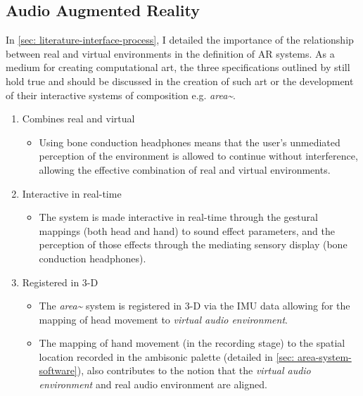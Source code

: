 \subsection{Audio Augmented Reality}            \label{sec: area-discussion-aar}
In \autoref{sec: literature-interface-process}, I detailed the importance of the relationship between real and virtual environments in the definition of AR systems. As a medium for creating computational art, the three specifications outlined by \citep{azuma1997} still hold true and should be discussed in the creation of such art or the development of their interactive systems of composition e.g. \textit{area\textasciitilde{}}.
\begin{enumerate}
    \item Combines real and virtual
        \begin{itemize}
            \item Using bone conduction headphones means that the user’s unmediated perception of the environment is allowed to continue without interference, allowing the effective combination of real and virtual environments.
        \end{itemize}
    \item Interactive in real-time
        \begin{itemize}
            \item The system is made interactive in real-time through the gestural mappings (both head and hand) to sound effect parameters, and the perception of those effects through the mediating sensory display (bone conduction headphones).
        \end{itemize}
    \item Registered in 3-D
        \begin{itemize}
            \item The \textit{area\textasciitilde{}} system is registered in 3-D via the IMU data allowing for the mapping of head movement to \textit{virtual audio environment}. 
            \item The mapping of hand movement (in the recording stage) to the spatial location recorded in the ambisonic palette (detailed in \autoref{sec: area-system-software}), also contributes to the notion that the \textit{virtual audio environment} and real audio environment are aligned.
        \end{itemize}
\end{enumerate}

